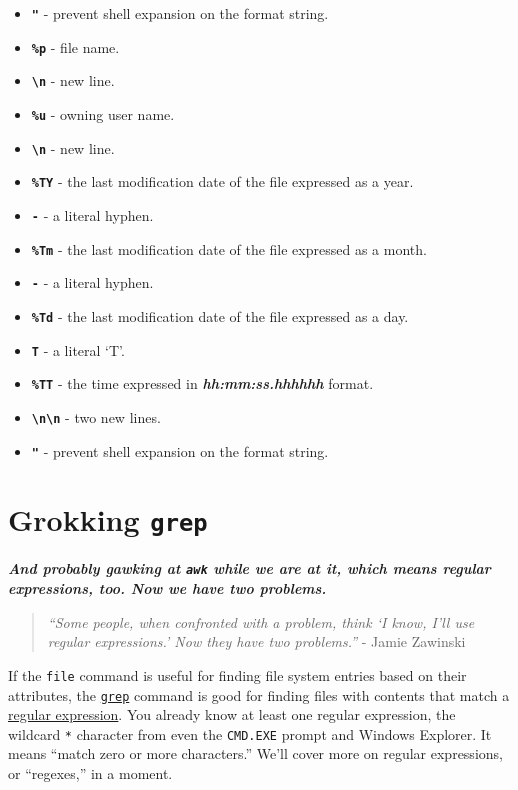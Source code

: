 \documentclass[10pt,]{book}
\numberwithin{figure}{chapter}
\begin{document}
\begin{itemize}
\itemsep1pt\parskip0pt
\item
  \textbf{\texttt{"}} - prevent shell expansion on the format string.
\item
  \textbf{\texttt{\%p}} - file name.
\item
  \textbf{\texttt{\textbackslash{}n}} - new line.
\item
  \textbf{\texttt{\%u}} - owning user name.
\item
  \textbf{\texttt{\textbackslash{}n}} - new line.
\item
  \textbf{\texttt{\%TY}} - the last modification date of the file
  expressed as a year.
\item
  \textbf{\texttt{-}} - a literal hyphen.
\item
  \textbf{\texttt{\%Tm}} - the last modification date of the file
  expressed as a month.
\item
  \textbf{\texttt{-}} - a literal hyphen.
\item
  \textbf{\texttt{\%Td}} - the last modification date of the file
  expressed as a day.
\item
  \textbf{\texttt{T}} - a literal `T'.
\item
  \textbf{\texttt{\%TT}} - the time expressed in
  \textbf{\emph{hh:mm:ss.hhhhhh}} format.
\item
  \textbf{\texttt{\textbackslash{}n\textbackslash{}n}} - two new lines.
\item
  \textbf{\texttt{"}} - prevent shell expansion on the format string.
\end{itemize}

\chapter{Grokking \texttt{grep}}\label{grokking-grep}

\textbf{\emph{And probably gawking at \texttt{awk} while we are at it,
which means regular expressions, too. Now we have two problems.}}

\begin{quote}
\emph{``Some people, when confronted with a problem, think `I know, I'll
use regular expressions.' Now they have two problems.''} - Jamie
Zawinski
\end{quote}

If the \texttt{file} command is useful for finding file system entries
based on their attributes, the
\href{http://linux.die.net/man/1/grep}{\texttt{grep}} command is good
for finding files with contents that match a
\href{https://en.wikipedia.org/wiki/Regular_expression}{regular
expression}. You already know at least one regular expression, the
wildcard \texttt{*} character from even the \texttt{CMD.EXE} prompt and
Windows Explorer. It means ``match zero or more characters.'' We'll
cover more on regular expressions, or ``regexes,'' in a moment.
\end{document}
